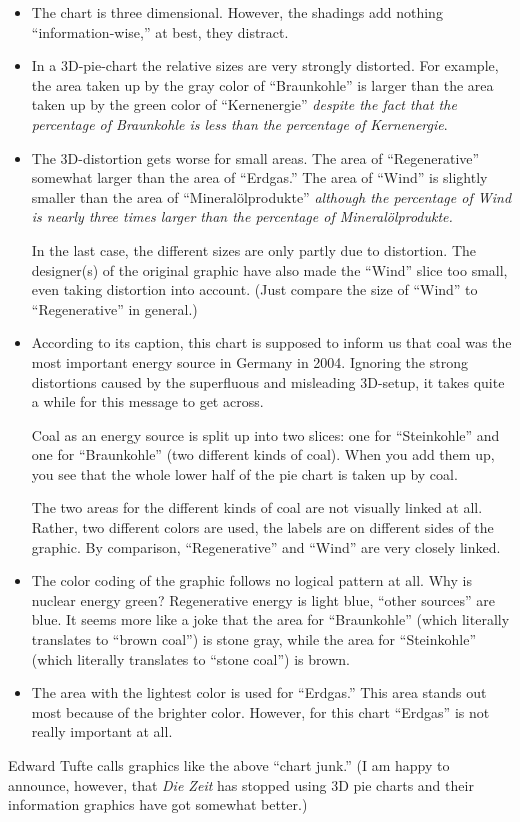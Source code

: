 \begin{itemize}
\item
  The chart is three dimensional. However, the shadings add
  nothing ``information-wise,'' at best, they distract.
\item
  In a 3D-pie-chart the relative sizes are very strongly
  distorted. For example, the area taken up by the gray color of ``Braunkohle''
  is larger than the area taken up by the green color of
  ``Kernenergie'' \emph{despite the fact that the percentage of
    Braunkohle is less than the percentage of Kernenergie}.
\item
  The 3D-distortion gets worse for small areas. The area of
  ``Regenerative'' somewhat larger  than the area of ``Erdgas.''
  The area of ``Wind'' is slightly smaller than the area of
  ``Mineral\"olprodukte'' \emph{although the percentage of Wind is
    nearly three times larger than the percentage of
    Mineral\"olprodukte.}

  In the last case, the different sizes are only partly due to
  distortion. The designer(s) of the original graphic have also made
  the ``Wind'' slice too small, even taking distortion into
  account. (Just compare the size of ``Wind'' to ``Regenerative'' in
  general.)
\item
  According to its caption, this chart is supposed to inform us that
  coal was the most important energy source in Germany in
  2004. Ignoring the strong distortions caused by the superfluous and
  misleading 3D-setup, it takes quite a while for this message to get
  across.

  Coal as an energy source is split up into two slices: one for
  ``Steinkohle'' and one for ``Braunkohle'' (two different kinds of
  coal). When you add them up, you see that the whole lower half of
  the pie chart is taken up by coal.

  The two areas for the different kinds of coal are not visually
  linked at all. Rather, two different colors are used, the labels are
  on different sides of the graphic. By comparison, ``Regenerative''
  and ``Wind'' are very closely linked.
\item
  The color coding of the graphic follows no logical pattern at
  all. Why is nuclear energy green? Regenerative energy is light blue,
  ``other sources'' are blue. It seems more like a joke that the area
  for ``Braunkohle'' (which literally translates to ``brown coal'') is
  stone gray, while the area for ``Steinkohle'' (which literally
  translates to ``stone coal'') is brown.
\item
  The area with the lightest color is used for ``Erdgas.'' This area
  stands out most because of the brighter color. However, for this
  chart ``Erdgas'' is not really important at all.
\end{itemize}
Edward Tufte calls graphics like the above ``chart junk.'' (I am happy
to announce, however, that \emph{Die Zeit} has stopped using 3D pie
charts and their information graphics have got somewhat better.)

